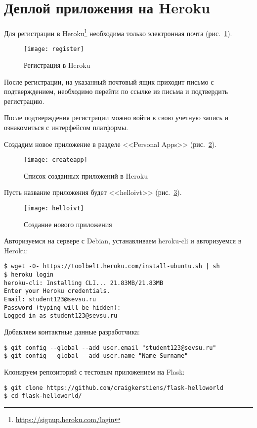 \section{Деплой приложения на Heroku} \label{pril:e}

Для регистрации в Heroku\footnote{\url{https://signup.heroku.com/login}} необходима только электронная почта (рис.~\ref{pic:heroku_reg}).
\begin{figure}[ht]
    \centering
    \texttt{[image: register]}
    \caption{Регистрация в Heroku}\label{pic:heroku_reg}
\end{figure}

После регистрации, на указанный почтовый ящик приходит письмо с подтверждением, необходимо перейти по ссылке из письма и подтвердить регистрацию.

После подтверждения регистрации можно войти в свою учетную запись и ознакомиться с интерфейсом платформы.

Создадим новое приложение в разделе <<Personal Apps>> (рис.~\ref{pic:add_app}).
\begin{figure}[ht]
    \centering
    \texttt{[image: createapp]}
    \caption{Список созданных приложений в Heroku}\label{pic:add_app}
\end{figure}

Пусть название приложения будет <<helloivt>> (рис.~\ref{pic:helloivt}).
\begin{figure}[ht]
    \centering
    \texttt{[image: helloivt]}
    \caption{Создание нового приложения}\label{pic:helloivt}
\end{figure}

Авторизуемся на сервере с Debian, устанавливаем heroku-cli и авторизуемся в Heroku:
\begin{lstlisting}
$ wget -O- https://toolbelt.heroku.com/install-ubuntu.sh | sh
$ heroku login
heroku-cli: Installing CLI... 21.83MB/21.83MB
Enter your Heroku credentials.
Email: student123@sevsu.ru
Password (typing will be hidden):
Logged in as student123@sevsu.ru
\end{lstlisting}

Добавляем контактные данные разработчика:
\begin{lstlisting}
$ git config --global --add user.email "student123@sevsu.ru"
$ git config --global --add user.name "Name Surname"
\end{lstlisting}

Клонируем репозиторий с тестовым приложением на Flask:
\begin{lstlisting}
$ git clone https://github.com/craigkerstiens/flask-helloworld
$ cd flask-helloworld/
\end{lstlisting}

